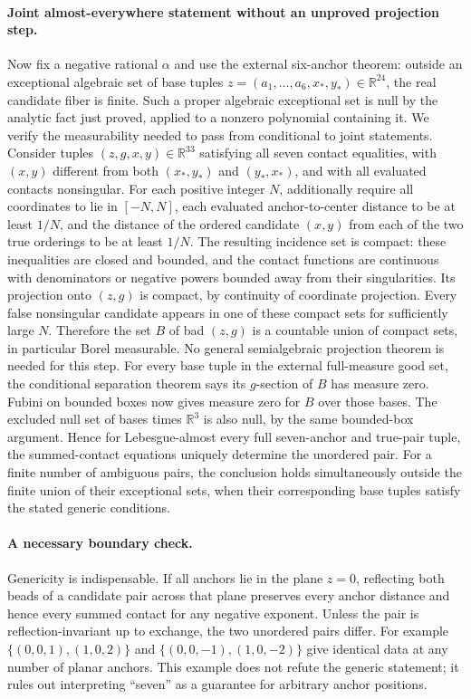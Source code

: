 \documentclass[11pt]{article}
\begin{document}
\paragraph{Joint almost-everywhere statement without an unproved projection step.}
Now fix a negative rational $\alpha$ and use the external six-anchor theorem:
outside an exceptional algebraic set of base tuples
$z=(a_1,\ldots,a_6,x_*,y_*)\in\mathbb R^{24}$, the real candidate fiber is
finite. Such a proper algebraic exceptional set is null by the analytic fact
just proved, applied to a nonzero polynomial containing it.
We verify the measurability needed to pass from conditional to joint statements.
Consider tuples $(z,g,x,y)\in\mathbb R^{33}$ satisfying all seven contact
equalities, with $(x,y)$ different from both $(x_*,y_*)$ and $(y_*,x_*)$,
and with all evaluated contacts nonsingular.
For each positive integer $N$, additionally require all coordinates to lie in
$[-N,N]$, each evaluated anchor-to-center distance to be at least $1/N$,
and the distance of the ordered candidate $(x,y)$ from each of the two true
orderings to be at least $1/N$.
The resulting incidence set is compact: these inequalities are closed and
bounded, and the contact functions are continuous with denominators or negative
powers bounded away from their singularities. Its projection onto $(z,g)$ is
compact, by continuity of coordinate projection. Every false nonsingular
candidate appears in one of these compact sets for sufficiently large $N$.
Therefore the set $B$ of bad $(z,g)$ is a countable union of compact sets,
in particular Borel measurable. No general semialgebraic projection theorem
is needed for this step.
For every base tuple in the external full-measure good set, the conditional
separation theorem says its $g$-section of $B$ has measure zero.
Fubini on bounded boxes now gives measure zero for $B$ over those bases.
The excluded null set of bases times $\mathbb R^3$ is also null, by the same
bounded-box argument. Hence for Lebesgue-almost every full seven-anchor and
true-pair tuple, the summed-contact equations uniquely determine the unordered
pair. For a finite number of ambiguous pairs, the conclusion holds simultaneously
outside the finite union of their exceptional sets, when their corresponding
base tuples satisfy the stated generic conditions.

\paragraph{A necessary boundary check.}
Genericity is indispensable. If all anchors lie in the plane $z=0$, reflecting
both beads of a candidate pair across that plane preserves every anchor distance
and hence every summed contact for any negative exponent. Unless the pair
is reflection-invariant up to exchange, the two unordered pairs differ.
For example $\{(0,0,1),(1,0,2)\}$ and
$\{(0,0,-1),(1,0,-2)\}$ give identical data at any number of planar anchors.
This example does not refute the generic statement; it rules out interpreting
``seven'' as a guarantee for arbitrary anchor positions.
\end{document}
